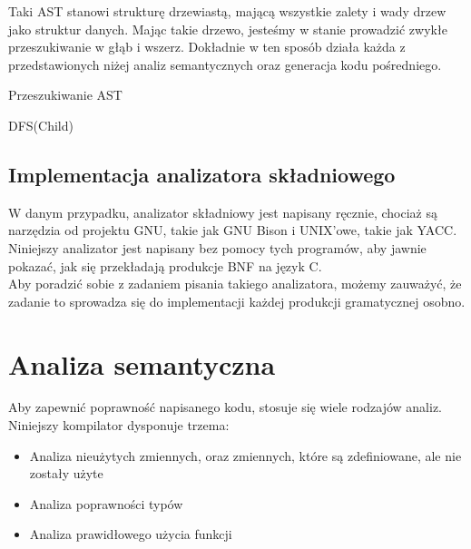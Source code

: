\documentclass[a4paper, 12pt]{extarticle}
\newcommand{\spacing}{\vskip 0.5cm}
\begin{document}
			\spacing
			
			Taki AST stanowi strukturę drzewiastą, mającą wszystkie zalety i wady drzew jako struktur
			danych. Mając takie drzewo, jesteśmy w stanie prowadzić zwykłe przeszukiwanie w głąb
			i wszerz. Dokładnie w ten sposób działa każda z przedstawionych niżej analiz semantycznych
			oraz generacja kodu pośredniego.

			\spacing

			\begin{algorithm}
				\caption{Przeszukiwanie AST}
				\begin{algorithmic}[1]

						\State DFS(Child)
					\EndFor
				\EndProcedure

				\end{algorithmic}
			\end{algorithm}

		\subsection{Implementacja analizatora składniowego}
			
			W danym przypadku, analizator składniowy jest napisany ręcznie, chociaż są narzędzia od
			projektu GNU, takie jak GNU Bison i UNIX'owe, takie jak YACC. Niniejszy analizator
		  	jest napisany bez pomocy tych programów, aby jawnie pokazać, jak się przekładają
		  	produkcje BNF na język C.
		  	\\
		  	
		  	Aby poradzić sobie z zadaniem pisania takiego analizatora, możemy zauważyć, że
		  	zadanie to sprowadza się do implementacji każdej produkcji gramatycznej osobno.

			\newpage
	
	\section{Analiza semantyczna}

		Aby zapewnić poprawność napisanego kodu, stosuje się wiele rodzajów analiz. Niniejszy kompilator
		dysponuje trzema:
		
		\begin{itemize}
			\item Analiza nieużytych zmiennych, oraz zmiennych, które są zdefiniowane, ale nie zostały użyte
			\item Analiza poprawności typów
			\item Analiza prawidłowego użycia funkcji
		\end{itemize}
		
\end{document}
